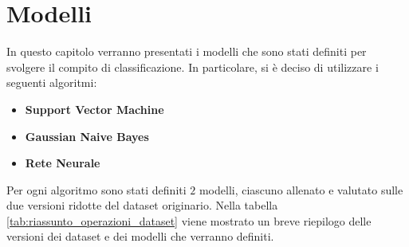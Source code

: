 \chapter{Modelli} \label{ch:modelli}
In questo capitolo verranno presentati i modelli che sono stati definiti
per svolgere il compito di classificazione. In particolare, si è deciso di
utilizzare i seguenti algoritmi:
\begin{itemize}
    \item \textbf{Support Vector Machine}
    \item \textbf{Gaussian Naive Bayes}
    \item \textbf{Rete Neurale}
\end{itemize}
Per ogni algoritmo sono stati definiti $2$ modelli, ciascuno allenato e valutato
sulle due versioni ridotte del dataset originario. Nella tabella
\ref{tab:riassunto_operazioni_dataset} viene mostrato un breve riepilogo delle
versioni dei dataset e dei modelli che verranno definiti.

